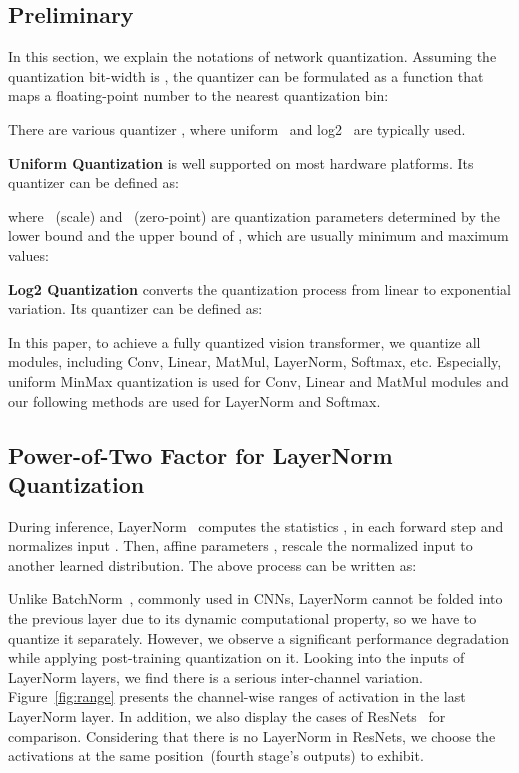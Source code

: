 \documentclass{article}
\begin{document}
\subsection{Preliminary}
\label{sec:method_pre}

In this section, we explain the notations of network quantization.
Assuming the quantization bit-width is , the quantizer  can be formulated as a function that maps a floating-point number  to the nearest quantization bin:




There are various quantizer , where uniform~\cite{jacob2018quantization} and log2~\cite{cai2018deep} are typically used.

\textbf{Uniform Quantization} is well supported on most hardware platforms. Its quantizer  can be defined as:


where ~(scale) and ~(zero-point) are quantization parameters determined by the lower bound  and the upper bound  of , which are usually minimum and maximum values:



\textbf{Log2 Quantization} converts the quantization process from linear to exponential variation. Its quantizer  can be defined as: 



In this paper, to achieve a fully quantized vision transformer, we quantize all modules, including Conv, Linear, MatMul, LayerNorm, Softmax, etc.
Especially, uniform MinMax quantization is used for Conv, Linear and MatMul modules and our following methods are used for LayerNorm and Softmax.

\subsection{Power-of-Two Factor for LayerNorm Quantization}
\label{sec:ptf}

During inference, LayerNorm~\cite{ba2016layer} computes the statistics , in each forward step and normalizes input . Then, affine parameters ,  rescale the normalized input to another learned distribution. The above process can be written as:



Unlike BatchNorm~\cite{ioffe2015batch}, commonly used in CNNs, LayerNorm cannot be folded into the previous layer due to its dynamic computational property, so we have to quantize it separately. However, we observe a significant performance degradation while applying post-training quantization on it.
Looking into the inputs of LayerNorm layers, we find there is a serious inter-channel variation.
Figure~\ref{fig:range} presents the channel-wise ranges of activation in the last LayerNorm layer. In addition, we also display the cases of ResNets~\cite{he2016deep} for comparison. Considering that there is no LayerNorm in ResNets, we choose the activations at the same position~(fourth stage's outputs) to exhibit.
\end{document}
